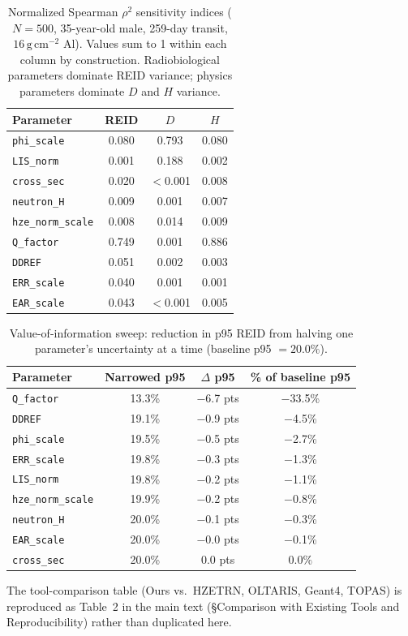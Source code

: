 \documentclass[a4paper,fleqn]{cas-sc}
\newcommand{\gcm}{\,\mathrm{g\,cm^{-2}}}
\newcommand{\code}[1]{\texttt{#1}}
\begin{document}
\begin{table}[t]
  \centering
  \caption{Normalized Spearman $\rho^2$ sensitivity indices ($N=500$,
           35-year-old male, 259-day transit, $16\gcm$ Al). Values sum to 1
           within each column by construction. Radiobiological parameters
           dominate REID variance; physics parameters dominate $D$ and $H$
           variance.}
  \label{tab:sensitivity}
  \small
  \begin{tabular*}{\tblwidth}{@{}LCCC@{}}
    \toprule
    Parameter & REID & $D$ & $H$ \\
    \midrule
    \code{phi\_scale}       & 0.080 & 0.793 & 0.080 \\
    \code{LIS\_norm}        & 0.001 & 0.188 & 0.002 \\
    \code{cross\_sec}       & 0.020 & $<$0.001 & 0.008 \\
    \code{neutron\_H}       & 0.009 & 0.001 & 0.007 \\
    \code{hze\_norm\_scale} & 0.008 & 0.014 & 0.009 \\
    \code{Q\_factor}        & 0.749 & 0.001 & 0.886 \\
    \code{DDREF}            & 0.051 & 0.002 & 0.003 \\
    \code{ERR\_scale}       & 0.040 & 0.001 & 0.001 \\
    \code{EAR\_scale}       & 0.043 & $<$0.001 & 0.005 \\
    \bottomrule
  \end{tabular*}
\end{table}

\begin{table}[t]
  \centering
  \caption{Value-of-information sweep: reduction in p95 REID from halving
           one parameter's uncertainty at a time (baseline p95 $=20.0\%$).}
  \label{tab:vov}
  \small
  \begin{tabular*}{\tblwidth}{@{}LCCC@{}}
    \toprule
    Parameter & Narrowed p95 & $\Delta$ p95 & \% of baseline p95 \\
    \midrule
    \code{Q\_factor}       & 13.3\% & $-$6.7 pts & $-$33.5\% \\
    \code{DDREF}           & 19.1\% & $-$0.9 pts & $-$4.5\%  \\
    \code{phi\_scale}      & 19.5\% & $-$0.5 pts & $-$2.7\%  \\
    \code{ERR\_scale}      & 19.8\% & $-$0.3 pts & $-$1.3\%  \\
    \code{LIS\_norm}       & 19.8\% & $-$0.2 pts & $-$1.1\%  \\
    \code{hze\_norm\_scale}& 19.9\% & $-$0.2 pts & $-$0.8\%  \\
    \code{neutron\_H}      & 20.0\% & $-$0.1 pts & $-$0.3\%  \\
    \code{EAR\_scale}      & 20.0\% & $-$0.0 pts & $-$0.1\%  \\
    \code{cross\_sec}      & 20.0\% & $0.0$ pts  & $0.0\%$   \\
    \bottomrule
  \end{tabular*}
\end{table}

The tool-comparison table (Ours vs.\ HZETRN, OLTARIS, Geant4, TOPAS) is
reproduced as Table~2 in the main text (\S{}Comparison with Existing Tools
and Reproducibility) rather than duplicated here.



\end{document}

